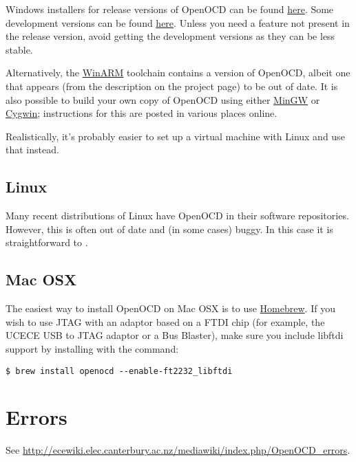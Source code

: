 Windows installers for release versions of OpenOCD can be found
\href{http://www.freddiechopin.info/index.php/en/download/category/4-openocd}{here}.
Some development versions can be found
\href{http://www.freddiechopin.info/index.php/en/download/category/10-openocd-dev}{here}.
Unless you need a feature not present in the release version, avoid
getting the development versions as they can be less stable.

Alternatively, the
\href{http://www.siwawi.arubi.uni-kl.de/avr_projects/arm_projects/}{WinARM}
toolchain contains a version of OpenOCD, albeit one that appears (from
the description on the project page) to be out of date. It is also
possible to build your own copy of OpenOCD using either
\href{http://www.mingw.org/}{MinGW} or
\href{http://www.cygwin.com/}{Cygwin}; instructions for this are posted
in various places online.

Realistically, it's probably easier to set up a virtual machine with
Linux and use that instead.

\subsection{Linux}
\label{linux}

Many recent distributions of Linux have OpenOCD in their software
repositories. However, this is often out of date and (in some cases)
buggy. In this case it is straightforward to
.

\subsection{Mac OSX}
\label{mac-osx}

The easiest way to install OpenOCD on Mac OSX is to use
\href{http://brew.sh/}{Homebrew}. If you wish to use JTAG with an
adaptor based on a FTDI chip (for example, the UCECE USB to JTAG
adaptor or a Bus Blaster), make sure you include libftdi support by
installing with the command:
%
\begin{verbatim}
$ brew install openocd --enable-ft2232_libftdi
\end{verbatim}

\section{Errors}
\label{errors}

See \url{http://ecewiki.elec.canterbury.ac.nz/mediawiki/index.php/OpenOCD_errors}.
